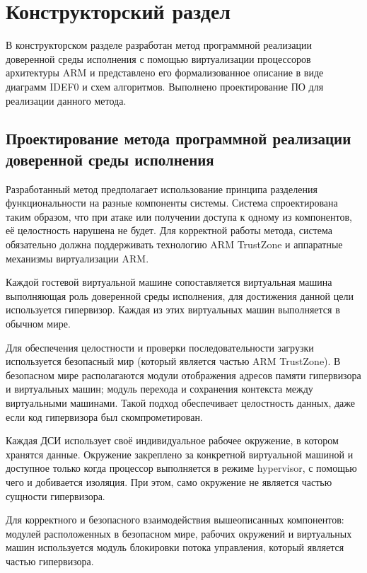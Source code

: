 \section{Конструкторский раздел}

В конструкторском разделе разработан метод программной реализации доверенной среды исполнения с помощью виртуализации процессоров архитектуры ARM и представлено его формализованное описание в виде диаграмм IDEF0 и схем алгоритмов. Выполнено проектирование ПО для реализации данного метода.

\subsection{Проектирование метода программной реализации доверенной среды исполнения}

Разработанный метод предполагает использование принципа разделения функциональности на разные компоненты системы. Система спроектирована таким образом, что при атаке или получении доступа к одному из компонентов, её целостность нарушена не будет. Для корректной работы метода, система обязательно должна поддерживать технологию ARM TrustZone и аппаратные механизмы виртуализации ARM.

Каждой гостевой виртуальной машине сопоставляется виртуальная машина выполняющая роль доверенной среды исполнения, для достижения данной цели используется гипервизор. Каждая из этих виртуальных машин выполняется в обычном мире.

Для обеспечения целостности и проверки последовательности загрузки используется безопасный мир (который является частью ARM TrustZone). В безопасном мире располагаются модули отображения адресов памяти гипервизора и виртуальных машин; модуль перехода и сохранения контекста между виртуальными машинами. Такой подход обеспечивает целостность данных, даже если код гипервизора был скомпрометирован.

Каждая ДСИ использует своё индивидуальное рабочее окружение, в котором хранятся данные. Окружение закреплено за конкретной виртуальной машиной и доступное только когда процессор выполняется в режиме hypervisor, с помощью чего и добивается изоляция. При этом, само окружение не является частью сущности гипервизора.

Для корректного и безопасного взаимодействия вышеописанных компонентов: модулей расположенных в безопасном мире, рабочих окружений и виртуальных машин используется модуль блокировки потока управления, который является частью гипервизора.

